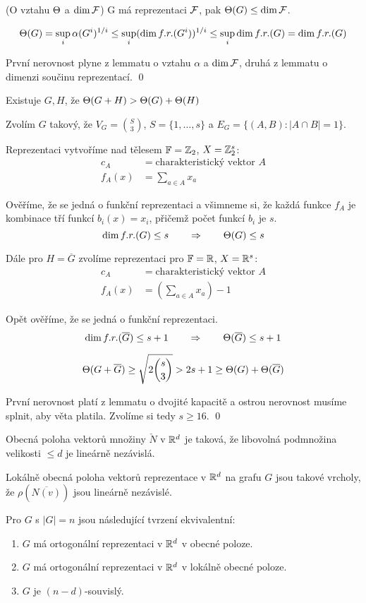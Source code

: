 \lm(O vztahu $\Theta$ a $\dim\mathcal{F}$) G má reprezentaci $\mathcal{F}$, pak $\Theta(G)
\leq \dim \mathcal{F}$.

\dk 
$$\Theta(G) = \sup_i \alpha(G^i)^{1/i} \leq \sup_i(\dim f.r.(G^i))^{1/i} \leq \sup_i\dim f.r. (G) = \dim f.r.(G)$$

První nerovnost plyne z lemmatu o vztahu $\alpha$ a $\dim\mathcal{F}$, druhá z
lemmatu o dimenzi součinu reprezentací.
\qed


\vt Existuje $G, H$, že $\Theta(G+H) > \Theta(G) + \Theta(H)$

\dk Zvolím $G$ takový, že $V_G={S\choose 3}$, $S = \{1, \dots, s\}$ a $E_G = \{ (A, B): |A\cap B| = 1\}$. 

Reprezentaci vytvoříme nad tělesem $\mathbb{F} = \mathbb{Z}_2$, $X = \mathbb{Z}_2^s$:
\begin{align*}
	c_A &= \text{charakteristický vektor } A \\ 
	f_A(x) &= \sum_{a\in A} x_a
\end{align*}

Ověříme, že se jedná o funkční reprezentaci a všimneme si, že každá
funkce $f_A$ je kombinace tří funkcí $b_i(x) = x_i$, přičemž počet funkcí
$b_i$ je $s$.
$$
\dim f.r.(G) \le s \qquad\Rightarrow\qquad \Theta(G) \le s
$$

Dále pro $H = \overline G$ zvolíme reprezentaci pro $\mathbb{F} = \mathbb{R}$, $X =
\mathbb{R}^s$:
\begin{align*}
	c_A &= \text{charakteristický vektor } A \\ 
	f_A(x) &= (\sum_{a\in A} x_a) - 1
\end{align*}

Opět ověříme, že se jedná o funkční reprezentaci.
$$
\dim f.r.(\overline G) \le s+1 \qquad\Rightarrow\qquad \Theta(\overline G) \le s+1
$$

$$\Theta(G + \overline G) \ge \sqrt{2{s\choose 3}} > 2s+1 \ge \Theta(G) + \Theta(\overline G)$$

První nerovnost platí z lemmatu o dvojité kapacitě a ostrou nerovnost
musíme splnit, aby věta platila. Zvolíme si tedy $s \ge 16$.
\qed

\df Obecná poloha vektorů množiny $\check N$ v  $\mathbb{R}^d$ je taková, že libovolná podmnožina velikosti $\leq d$ je lineárně nezávislá.

\df Lokálně obecná poloha vektorů reprezentace v $\mathbb{R}^d$ na grafu $G$ jsou takové vrcholy, že $\rho(\overline{N(v)})$ jsou lineárně nezávislé.

\vt Pro $G$ s $|G| = n$ jsou následující tvrzení ekvivalentní:
\begin{enumerate}
	\item $G$ má ortogonální reprezentaci v $\mathbb{R}^d$ v obecné poloze.
	\item $G$ má ortogonální reprezentaci v $\mathbb{R}^d$ v lokálně obecné poloze.
	\item $G$ je $(n-d)$-souvislý.
\end{enumerate}


